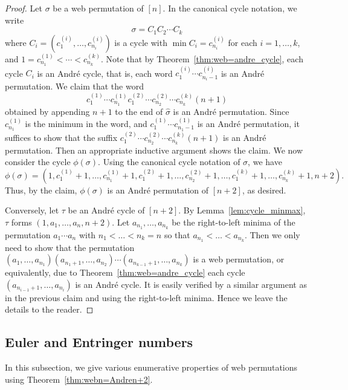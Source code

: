 \begin{proof}
  Let $\sigma$ be a web permutation of \( [n] \).
  In the canonical cycle notation, we write 
  \[
    \sigma=C_1 C_2 \cdots C_k 
  \]
  where \( C_i = (c^{(i)}_{1}, \dots, c^{(i)}_{n_i}) \) is a cycle with $\min C_i = c^{(i)}_{n_i}$ for each \( i=1,\dots,k \), and $1=c^{(1)}_{n_1}<\cdots<c^{(k)}_{n_k}$.
  Note that by Theorem~\ref{thm:web=andre_cycle}, each cycle \( C_i \) is an
  Andr\'e cycle, that is, each word \( c^{(i)}_1\cdots c^{(i)}_{n_i-1} \) is
  an Andr\'e permutation.
  We claim that the word
  \[
    c^{(1)}_1\cdots c^{(1)}_{n_1} c^{(2)}_{1}\cdots c^{(2)}_{n_2}\cdots c^{(k)}_{n_k} (n+1)
  \] obtained by appending \( n+1 \) to the end of \( \widehat{\sigma} \)
  is an Andr\'e permutation.
  Since \( c^{(1)}_{n_1} \) is the minimum in the word, and
  \( c^{(1)}_1\cdots c^{(1)}_{n_1-1} \) is an Andr\'e permutation,
  it suffices to show that the suffix \( c^{(2)}_{1}\cdots c^{(2)}_{n_2}\cdots
  c^{(k)}_{n_k} (n+1) \) is an Andr\'e permutation.
  Then an appropriate inductive argument shows the claim.
  We now consider the cycle \( \phi(\sigma) \).
  Using the canonical cycle notation of \( \sigma \), we have
  \[
    \phi(\sigma)
    = (1,c^{(1)}_1+1,\dots, c^{(1)}_{n_1}+1,c^{(2)}_1 +1,\dots,c^{(2)}_{n_2}+1,\dots,c^{(k)}_1+1 ,\dots, c^{(k)}_{n_k}+1,n+2 ).
  \]
  Thus, by the claim, \(\phi(\sigma)\) is an Andr\'e permutation of \( [n+2] \),
  as desired.

  Conversely, let \( \tau \) be an Andr\'e cycle of \( [n+2] \).
  By Lemma~\ref{lem:cycle_minmax}, \( \tau \) forms \( (1,a_1,\dots,a_n, n+2) \).
  Let \( a_{n_1},\dots,a_{n_k} \) be the right-to-left minima of the permutation
  \( a_1\cdots a_n \) with \( n_1<\dots<n_k=n \) so that \( a_{n_1}<\dots<a_{n_k} \).
  Then we only need to show that the permutation
  \( (a_1,\dots,a_{n_1})(a_{n_1+1},\dots,a_{n_2})\cdots (a_{n_{k-1}+1},\dots,a_{n_k}) \)
  is a web permutation, or equivalently, due to Theorem~\ref{thm:web=andre_cycle}
  each cycle \( (a_{n_{i-1}+1},\dots,a_{n_i}) \) is an Andr\'e cycle.
  It is easily verified by a similar argument as in the previous claim and
  using the right-to-left minima.
  Hence we leave the details to the reader.
\end{proof}

\subsection{Euler and Entringer numbers}
In this subsection, we give various enumerative properties of
web permutations using Theorem~\ref{thm:webn=Andren+2}.

